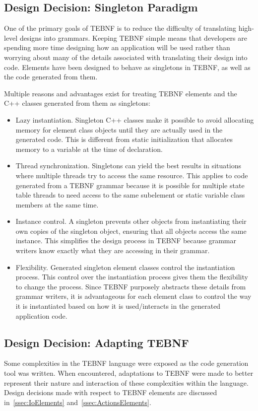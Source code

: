 \subsection{Design Decision: Singleton Paradigm}
One of the primary goals of TEBNF is to reduce the difficulty of translating high-level designs into grammars.  Keeping TEBNF simple means that developers are spending more time designing how an application will be used rather than worrying about many of the details associated with translating their design into code.   Elements have been designed to behave as singletons in TEBNF, as well as the code generated from them.

\indent
Multiple reasons and advantages exist for treating TEBNF elements and the C++ classes generated from them as singletons:
\begin{itemize}
  \item Lazy instantiation.  Singleton C++ classes make it possible to avoid allocating memory for element class objects until they are actually used in the generated code.  This is different from static initialization that allocates memory to a variable at the time of declaration.
  \item Thread synchronization.   Singletons can yield the best results in situations where multiple threads try to access the same resource.  This applies to code generated from a TEBNF grammar because it is possible for multiple state table threads to need access to the same subelement or static variable class members at the same time.
  \item Instance control.  A singleton prevents other objects from instantiating their own copies of the singleton object, ensuring that all objects access the same instance.  This simplifies the design process in TEBNF because grammar writers know exactly what they are accessing in their grammar.
  \item Flexibility.  Generated singleton element classes control the instantiation process.  This control over the instantiation process gives them the flexibility to change the process.  Since TEBNF purposely abstracts these details from grammar writers, it is advantageous for each element class to control the way it is instantiated based on how it is used/interacts in the generated application code.
\end{itemize}

\subsection{Design Decision: Adapting TEBNF}
Some complexities in the TEBNF language were exposed as the code generation tool was written.  When encountered, adaptations to TEBNF were made to better represent their nature and interaction of these complexities within the language.  Design decisions made with respect to TEBNF elements are discussed in~\ref{ssec:IoElements} and~\ref{ssec:ActionsElements}.

